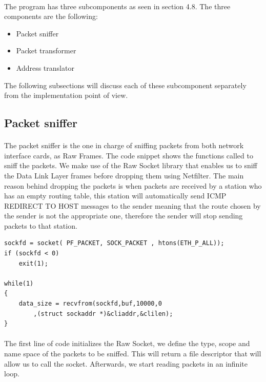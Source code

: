 \documentclass[oneside,12pt,a4paper,final]{book}
\begin{document}
\paragraph{}
The program has three subcomponents as seen in section 4.8. The three components are the following:
\begin{itemize}
\item Packet sniffer
\item Packet transformer
\item Address translator
\end{itemize}
The following subsections will discuss each of these subcomponent separately from the implementation point of view.

\subsection{Packet sniffer}
\paragraph{}
The packet sniffer is the one in charge of sniffing packets from both network interface cards, as Raw Frames. The code snippet shows the functions called to sniff the packets. We make use of the Raw Socket library that enables us to sniff the Data Link Layer frames before dropping them using Netfilter.
The main reason behind dropping the packets is when packets are received by a station who has an empty routing table, this station will automatically send ICMP REDIRECT TO HOST messages to the sender meaning that the route chosen by the sender is not the appropriate one, therefore the sender will stop sending packets to that station.

\begin{lstlisting}
sockfd = socket( PF_PACKET, SOCK_PACKET , htons(ETH_P_ALL));
if (sockfd < 0)
	exit(1);
	
while(1)
{
	data_size = recvfrom(sockfd,buf,10000,0
		,(struct sockaddr *)&cliaddr,&clilen);
}

\end{lstlisting}
\paragraph{}
The first line of code initializes the Raw Socket, we define the type, scope and name space of the packets to be sniffed. This will return a file descriptor that will allow us to call the socket. Afterwards, we start reading packets in an infinite loop.
\end{document}
